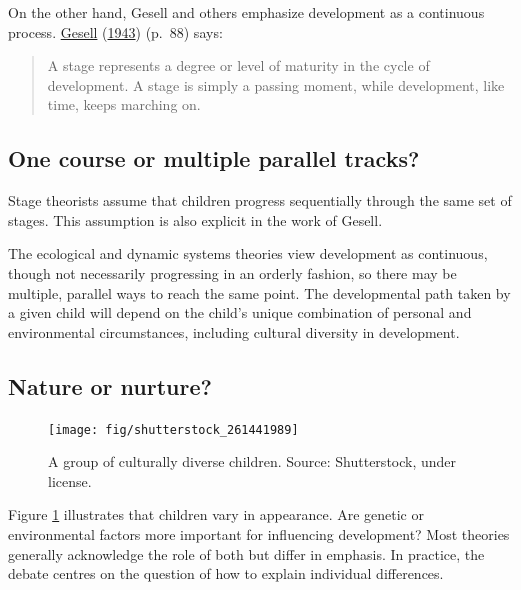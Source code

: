 \documentclass[
]{book}
\begin{document}
On the other hand, Gesell and others emphasize development as a continuous process. \protect\hyperlink{ref-gesell1943}{Gesell} (\protect\hyperlink{ref-gesell1943}{1943}) (p.~88) says:

\begin{quote}
A stage represents a degree or level of maturity in the cycle of development. A stage is simply a passing moment, while development, like time, keeps marching on.
\end{quote}

\hypertarget{one-course-or-multiple-parallel-tracks}{%
\subsection{One course or multiple parallel tracks?}\label{one-course-or-multiple-parallel-tracks}}

Stage theorists assume that children progress sequentially through the same set of stages. This assumption is also explicit in the work of Gesell.

The ecological and dynamic systems theories view development as continuous, though not necessarily progressing in an orderly fashion, so there may be multiple, parallel ways to reach the same point. The developmental path taken by a given child will depend on the child's unique combination of personal and environmental circumstances, including cultural diversity in development.

\hypertarget{nature-or-nurture}{%
\subsection{Nature or nurture?}\label{nature-or-nurture}}

\begin{figure}

{\centering \texttt{[image: fig/shutterstock\_261441989]} 

}

\caption{A group of culturally diverse children. Source: Shutterstock, under license.}\label{fig:diverse}
\end{figure}



Figure \ref{fig:diverse} illustrates that children vary in appearance. Are genetic or environmental factors more important for influencing development? Most theories generally acknowledge the role of both but differ in emphasis. In practice, the debate centres on the question of how to explain individual differences.
\end{document}
